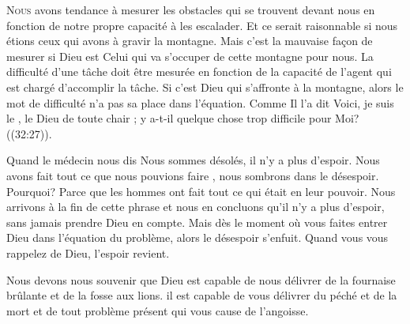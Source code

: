 




\lettrine{N}{ous} avons tendance à mesurer les obstacles
 qui se trouvent devant nous en fonction de notre propre capacité
 à les escalader. Et ce serait raisonnable si nous étions ceux qui avons
 à gravir la montagne. Mais c'est la mauvaise fa\c{c}on de mesurer
 si Dieu est Celui qui va s'occuper de cette montagne pour nous.
 La difficulté d'une tâche doit être mesurée en fonction de la capacité
 de l'agent qui est chargé d'accomplir la tâche.
 Si c'est Dieu qui s'affronte à la montagne, alors le mot
 de  \Og difficulté \Fg{}
 n'a pas sa place dans l'équation.
 Comme Il l'a dit\frcolon {}
 \Og Voici, je suis le \Seigneur, le Dieu de toute chair ;
 y a-t-il quelque chose trop difficile pour Moi? \Fg{}
 ((32:27)). 


Quand le médecin nous dis\frcolon {}
 \Og Nous sommes désolés, il n'y a plus d'espoir.
 Nous avons fait tout ce que nous pouvions faire \Fg{},
 nous sombrons dans le désespoir. Pourquoi?
 Parce que les hommes ont fait tout ce qui était en leur pouvoir.
 Nous arrivons à la fin de cette phrase et nous en concluons
 qu'il n'y a plus d'espoir, sans jamais prendre Dieu en compte.
 Mais dès  le moment où vous faites entrer Dieu
 dans l'équation du problème, alors le désespoir s'enfuit.
 Quand vous vous rappelez de Dieu, l'espoir revient. 

Nous devons nous souvenir que Dieu est capable de nous délivrer
 de la fournaise brûlante et de la fosse aux lions.
 il est capable de vous délivrer du péché et de la mort
 \ocadr et de tout problème présent qui vous cause de l'angoisse.

